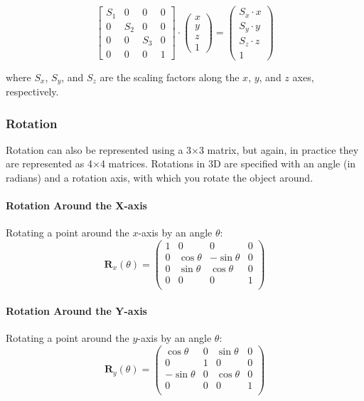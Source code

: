 \documentclass[12pt]{article}
\begin{document}
\[
    \begin{bmatrix}
        {S_1} & 0     & 0     & 0 \\
        0     & {S_2} & 0     & 0 \\
        0     & 0     & {S_3} & 0 \\
        0     & 0     & 0     & 1
    \end{bmatrix} \cdot
    \begin{pmatrix} x \\ y \\ z \\ 1 \end{pmatrix} =
    \begin{pmatrix} {S_x} \cdot x \\ {S_y} \cdot y \\ {S_z} \cdot z \\ 1 \end{pmatrix}
\]

where \( S_x \), \( S_y \), and \( S_z \) are the scaling factors along the \( x \), \( y \), and \( z \) axes, respectively.

\subsubsection{Rotation}

Rotation can also be represented using a 3$\times$3 matrix, but again, in practice they are represented as 4$\times$4 matrices.
Rotations in 3D are specified with an angle (in radians) and a rotation axis, with which you rotate the object around.

\paragraph{Rotation Around the X-axis}

Rotating a point around the \(x\)-axis by an angle \(\theta\):
\[
    \mathbf{R}_x(\theta) = \begin{pmatrix}
        1 & 0           & 0            & 0 \\
        0 & \cos \theta & -\sin \theta & 0 \\
        0 & \sin \theta & \cos \theta  & 0 \\
        0 & 0           & 0            & 1 \\
    \end{pmatrix}
\]

\paragraph{Rotation Around the Y-axis}
Rotating a point around the \(y\)-axis by an angle \(\theta\):
\[
    \mathbf{R}_y(\theta) = \begin{pmatrix}
        \cos \theta  & 0 & \sin \theta & 0 \\
        0            & 1 & 0           & 0 \\
        -\sin \theta & 0 & \cos \theta & 0 \\
        0            & 0 & 0           & 1 \\
    \end{pmatrix}
\]
\end{document}
